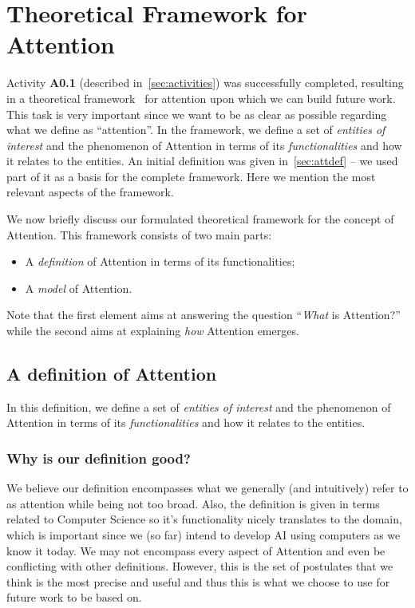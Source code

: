 \documentclass[12pt]{article}
\begin{document}
\section{Theoretical Framework for Attention}
Activity \textbf{A0.1} (described in~\ref{sec:activities}) was successfully completed,
resulting in a theoretical framework~\cite{ref:framework} for attention upon which we can build future work.
This task is very important since we want to be as clear as possible regarding what we define as ``attention''.
In the framework, we define a set of \emph{entities of interest} and the phenomenon of Attention in terms of
its \emph{functionalities} and how it relates to the entities.
An initial definition was given in~\ref{sec:attdef} -- we used part of it as a basis for the complete framework.
Here we mention the most relevant aspects of the framework.

We now briefly discuss our formulated theoretical framework for the concept of Attention.
This framework consists of two main parts:
\begin{itemize}
    \item A \emph{definition} of Attention in terms of its functionalities;
    \item A \emph{model} of Attention.
\end{itemize}
Note that the first element aims at answering the question ``\emph{What} is Attention?''
while the second aims at explaining \emph{how} Attention emerges.

\subsection{A definition of Attention}
\label{sec:definition}
In this definition, we define a set of \emph{entities of interest} and the phenomenon of Attention in terms of
its \emph{functionalities} and how it relates to the entities.

\subsubsection{Why is our definition good?}
We believe our definition encompasses what we generally (and intuitively) refer to as attention while being not too broad.
Also, the definition is given in terms related to Computer Science so it’s functionality nicely translates to the domain,
which is important since we (so far) intend to develop AI using computers as we know it today.
We may not encompass every aspect of Attention and even be conflicting with other definitions.
However, this is the set of postulates that we think is the most precise and useful and thus this is
what we choose to use for future work to be based on.
\end{document}
